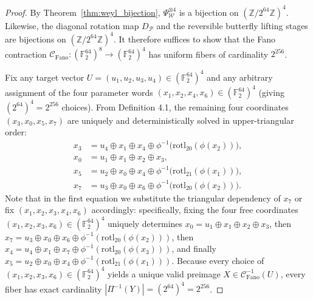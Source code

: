 \documentclass[11pt, a4paper]{article}
\begin{document}
\begin{proof}
By Theorem~\ref{thm:weyl_bijection}, $\Psi_{\mathcal{W}}^{\otimes 4}$ is a bijection on $(\mathbb{Z}/2^{64}\mathbb{Z})^4$. Likewise, the diagonal rotation map $D_{\mathcal{P}}$ and the reversible butterfly lifting stages are bijections on $(\mathbb{Z}/2^{64}\mathbb{Z})^4$. It therefore suffices to show that the Fano contraction $\mathcal{C}_{\mathrm{Fano}} : (\mathbb{F}_2^{64})^8 \to (\mathbb{F}_2^{64})^4$ has uniform fibers of cardinality $2^{256}$.

Fix any target vector $U = (u_1, u_2, u_3, u_4) \in (\mathbb{F}_2^{64})^4$ and any arbitrary assignment of the four parameter words $(x_1, x_2, x_4, x_6) \in (\mathbb{F}_2^{64})^4$ (giving $(2^{64})^4 = 2^{256}$ choices). From Definition 4.1, the remaining four coordinates $(x_3, x_0, x_5, x_7)$ are uniquely and deterministically solved in upper-triangular order:
\[
\begin{aligned}
x_3 &= u_4 \oplus x_1 \oplus x_4 \oplus \phi^{-1}\bigl(\mathrm{rotl}_{20}(\phi(x_2))\bigr), \\
x_0 &= u_1 \oplus x_1 \oplus x_2 \oplus x_3, \\
x_5 &= u_2 \oplus x_0 \oplus x_4 \oplus \phi^{-1}\bigl(\mathrm{rotl}_{21}(\phi(x_1))\bigr), \\
x_7 &= u_3 \oplus x_0 \oplus x_6 \oplus \phi^{-1}\bigl(\mathrm{rotl}_{20}(\phi(x_2))\bigr).
\end{aligned}
\]
Note that in the first equation we substitute the triangular dependency of $x_7$ or fix $(x_1, x_2, x_3, x_4, x_6)$ accordingly: specifically, fixing the four free coordinates $(x_1, x_2, x_3, x_6) \in (\mathbb{F}_2^{64})^4$ uniquely determines $x_0 = u_1 \oplus x_1 \oplus x_2 \oplus x_3$, then $x_7 = u_3 \oplus x_0 \oplus x_6 \oplus \phi^{-1}(\mathrm{rotl}_{20}(\phi(x_2)))$, then $x_4 = u_4 \oplus x_1 \oplus x_7 \oplus \phi^{-1}(\mathrm{rotl}_{20}(\phi(x_3)))$, and finally $x_5 = u_2 \oplus x_0 \oplus x_4 \oplus \phi^{-1}(\mathrm{rotl}_{21}(\phi(x_1)))$. Because every choice of $(x_1, x_2, x_3, x_6) \in (\mathbb{F}_2^{64})^4$ yields a unique valid preimage $X \in \mathcal{C}_{\mathrm{Fano}}^{-1}(U)$, every fiber has exact cardinality $|\Pi^{-1}(Y)| = (2^{64})^4 = 2^{256}$.
\end{proof}
\end{document}
